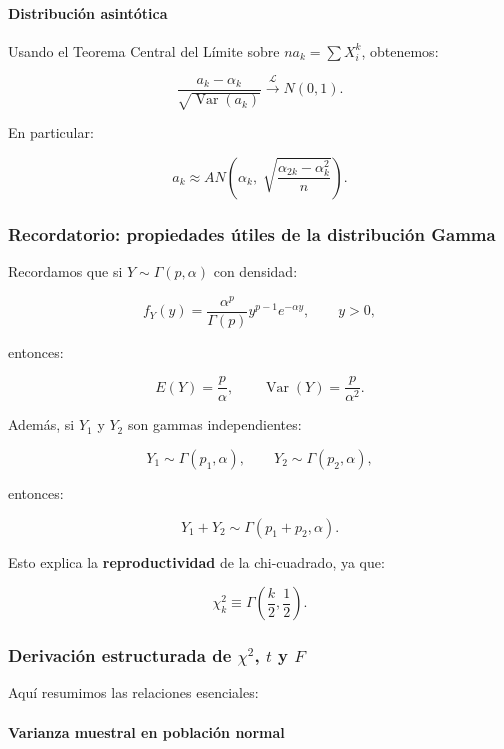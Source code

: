 \documentclass[
]{article}
\begin{document}
\paragraph{Distribución asintótica}\label{distribuciuxf3n-asintuxf3tica}

Usando el Teorema Central del Límite sobre \(n a_k = \sum X_i^k\), obtenemos:

\[
\frac{a_k - \alpha_k}{\sqrt{\operatorname{Var}(a_k)}}
\xrightarrow{\mathcal{L}} N(0,1).
\]

En particular:

\[
a_k \approx AN\left(
\alpha_k,\;
\sqrt{\frac{\alpha_{2k}-\alpha_k^2}{n}}
\right).
\]

\subsubsection{Recordatorio: propiedades útiles de la distribución Gamma}\label{recordatorio-propiedades-uxfatiles-de-la-distribuciuxf3n-gamma}

Recordamos que si \(Y\sim \Gamma(p, \alpha)\) con densidad:

\[
f_Y(y) = \frac{\alpha^p}{\Gamma(p)} y^{p-1} e^{-\alpha y},
\qquad y>0,
\]

entonces:

\[
E(Y) = \frac{p}{\alpha},
\qquad
\operatorname{Var}(Y) = \frac{p}{\alpha^2}.
\]

Además, si \(Y_1\) y \(Y_2\) son gammas independientes:

\[
Y_1 \sim \Gamma(p_1,\alpha),\qquad
Y_2 \sim \Gamma(p_2,\alpha),
\]

entonces:

\[
Y_1 + Y_2 \sim \Gamma(p_1+p_2, \alpha).
\]

Esto explica la \textbf{reproductividad} de la chi-cuadrado, ya que:

\[
\chi_k^2 \equiv \Gamma\left(\frac{k}{2}, \frac12\right).
\]

\subsubsection{\texorpdfstring{Derivación estructurada de \(\chi^2\), \(t\) y \(F\)}{Derivación estructurada de \textbackslash chi\^{}2, t y F}}\label{derivaciuxf3n-estructurada-de-chi2-t-y-f}

Aquí resumimos las relaciones esenciales:

\paragraph{Varianza muestral en población normal}\label{varianza-muestral-en-poblaciuxf3n-normal}
\end{document}
